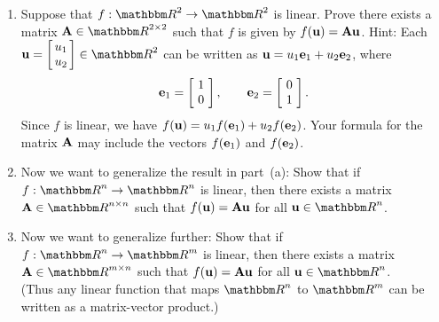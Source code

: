 \begin{enumerate}
\item Suppose that $f: \R^2 \to \R^2$ is linear.  
      Prove there exists a matrix $\BA\in\R^{2\times 2}$ such that
      $f$ is given by $f({\bf u}) = {\bf A}{\bf u}$.  
      Hint: Each $\Bu  = \left[\!\!\begin{array}{c} u_1 \\ u_2\end{array}\!\!\right] \in \R^2$
            can be written as ${\bf u} = u_1 {\bf e}_1 + u_2 {\bf e}_2$, where
                 \[ {\bf e}_1 = \left[\!\begin{array}{c} 1 \\ 0\end{array}\!\right], \qquad
                    {\bf e}_2 = \left[\!\begin{array}{c} 0 \\ 1\end{array}\!\right]. \] 
      Since $f$ is linear, we have $f({\bf u}) =  u_1 f({\bf e}_1) + u_2 f({\bf e}_2)$.
      Your formula for the matrix ${\bf A}$ may include the vectors $f({\bf e}_1)$ and $f({\bf e}_2)$.
\\
\item Now we want to generalize the result in part~(a): Show that if 
      $f: \R^n \to \R^n$ is linear, then there exists a matrix $\BA\in\Rnn$
      such that $f({\bf u}) = {\bf A}{\bf u}$ for all $\Bu\in\Rn$.
\\
\item Now we want to generalize further: Show that if 
      $f: \R^n \to \R^m$ is linear, then there exists a matrix $\BA\in\Rmn$
      such that $f({\bf u}) = {\bf A}{\bf u}$ for all $\Bu\in\Rn$.\\[0.5em]
      (Thus any linear function that maps $\R^n$ to $\R^m$ can be written 
        as a matrix-vector product.)
\end{enumerate}


